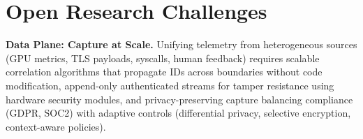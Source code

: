 \documentclass[sigplan,screen,9pt]{acmart}
\begin{document}




\section{Open Research Challenges}

\textbf{Data Plane: Capture at Scale.} Unifying telemetry from heterogeneous sources (GPU metrics, TLS payloads, syscalls, human feedback) requires scalable correlation algorithms that propagate IDs across boundaries without code modification, append-only authenticated streams for tamper resistance using hardware security modules, and privacy-preserving capture balancing compliance (GDPR, SOC2) with adaptive controls (differential privacy, selective encryption, context-aware policies).
\end{document}
